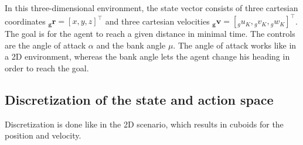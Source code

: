 In this three-dimensional environment, the state vector consists of three cartesian coordinates $\boldsymbol{{}_g r}=[x,y,z]^\top$ and three cartesian velocities $\boldsymbol{{}_g v}=[{}_g u_K,{}_g v_K,{}_g w_K]^\top$. The goal is for the agent to reach a given distance in minimal time. The controls are the angle of attack $\alpha$ and the bank angle $\mu$. The angle of attack works like in a 2D environment, whereas the bank angle lets the agent change his heading in order to reach the goal.

\subsection{Discretization of the state and action space}
\label{sec:disc3d}

Discretization is done like in the 2D scenario, which results in cuboids for the position and velocity.
